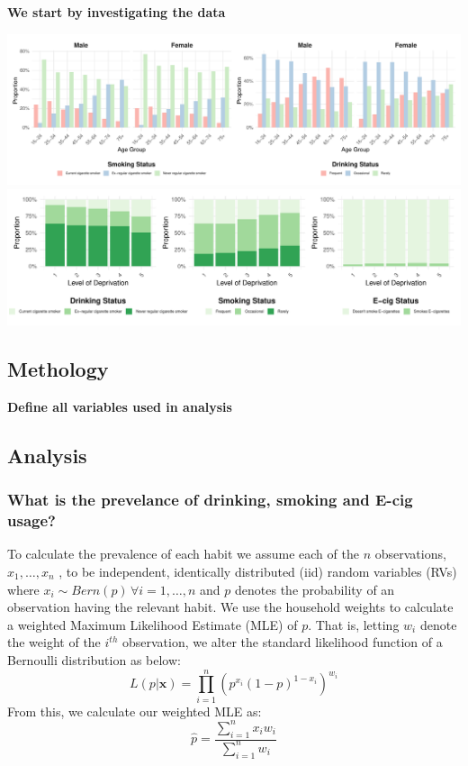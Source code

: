 \documentclass[
  11pt,
]{article}
\begin{document}
\textbf{We start by investigating the data}

\includegraphics{Coursework_files/figure-latex/output smoking and drinking by age plot-1.pdf}
\\

\includegraphics{Coursework_files/figure-latex/output deprivation plot-1.pdf}\\

\hypertarget{methology}{%
\subsection{Methology}\label{methology}}

\textbf{Define all variables used in analysis}

\hypertarget{analysis}{%
\subsection{Analysis}\label{analysis}}

\hypertarget{what-is-the-prevelance-of-drinking-smoking-and-e-cig-usage}{%
\subsubsection{What is the prevelance of drinking, smoking and E-cig
usage?}\label{what-is-the-prevelance-of-drinking-smoking-and-e-cig-usage}}

To calculate the prevalence of each habit we assume each of the \(n\)
observations, \(x_1,…,x_n\) , to be independent, identically distributed
(iid) random variables (RVs) where
\(x_i \sim Bern(p)\, \forall i=1,…,n\) and \(p\) denotes the probability
of an observation having the relevant habit. We use the household
weights to calculate a weighted Maximum Likelihood Estimate (MLE) of
\(p\). That is, letting \(w_i\) denote the weight of the \(i^{th}\)
observation, we alter the standard likelihood function of a Bernoulli
distribution as below:
\[L(p|\textbf{x}) = \prod_{i = 1}^{n} (p^{x_i}(1-p)^{1-x_i})^{w_i}\]
From this, we calculate our weighted MLE as:
\[\widehat{p} = \frac{\sum_{i=1}^{n} x_iw_i}{\sum_{i=1}^{n} w_i}\]
\end{document}
